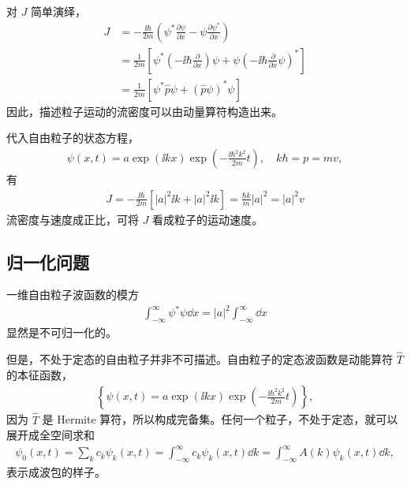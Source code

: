 对 $J$ 简单演绎，
\begin{align}
    J &= -\frac{\ii\hbar}{2m} \left( \psi^* \frac{\partial \psi}{\partial x} - \psi \frac{\partial \psi^*}{\partial x}\right) \\
    &= \frac{1}{2m} \left[
        \psi^* \left(-\ii\hbar\frac{\partial}{\partial x}\right) \psi +
        \psi \left(-\ii\hbar\frac{\partial}{\partial x} \psi\right)^*
    \right] \\
    &= \frac1{2m} \left[\psi^* \hat p \psi + (\hat p\psi)^* \psi\right]
\end{align}
因此，描述粒子运动的流密度可以由动量算符构造出来。

代入自由粒子的状态方程，
\begin{eqnarray}
    \psi(x,t) = a \exp (\ii k x) \exp \left( - \frac{\ii\hbar^2k^2}{2m}t\right), \quad k\hbar = p = mv,
\end{eqnarray}
有
\begin{eqnarray}
    J = -\frac{\ii\hbar}{2m} [|a|^2 \ii k + |a|^2 \ii k] = \frac{\hbar k} m |a|^2 = |a|^2 v
\end{eqnarray}
流密度与速度成正比，可将 $J$ 看成粒子的运动速度。


\subsection{归一化问题}
一维自由粒子波函数的模方
\begin{eqnarray}
    \int_{-\infty}^\infty \psi^*\psi \dd x = |a|^2 \int_{-\infty}^\infty \dd x
\end{eqnarray}
显然是不可归一化的。

但是，不处于定态的自由粒子并非不可描述。自由粒子的定态波函数是动能算符 $\hat T$ 的本征函数，
\begin{eqnarray}
    \left\{\psi(x,t) = a \exp (\ii k x) \exp \left( - \frac{\ii\hbar^2k^2}{2m}t\right)
    \right\},
\end{eqnarray}
因为 $\hat T$ 是 Hermite 算符，所以构成完备集。任何一个粒子，不处于定态，就可以展开成全空间求和
\begin{eqnarray}
    \psi_0 (x,t) = \sum_k c_k\psi_k(x,t) = \int_{-\infty}^\infty c_k\psi_k (x,t) \dd k = \int_{-\infty}^\infty A(k) \psi_k(x,t) \dd k, \label{eq:wave_expand_fullSet}
\end{eqnarray}
表示成波包的样子。

